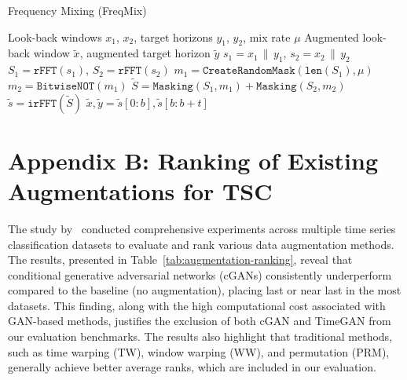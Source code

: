 \documentclass[a4paper,12pt]{report}
\begin{document}
\begin{algorithm}
   \caption{Frequency Mixing (FreqMix)~\cite{chen2023fraugfrequencydomainaugmentation}}
   \label{alg: freqmixing}
   \begin{algorithmic}[1]
       \REQUIRE
           Look-back windows $x_1$, $x_2$, target horizons $y_1$, $y_2$, mix rate $\mu$
       \ENSURE
           Augmented look-back window $\tilde{x}$, augmented target horizon $\tilde{y}$
       \STATE $s_1 = x_1 \,\|\, y_1$, \quad $s_2 = x_2 \,\|\, y_2$  \label{alg: freqmixing:concat}
       \STATE $S_1 = \texttt{rFFT}(s_1)$, \quad $S_2 = \texttt{rFFT}(s_2)$  \label{alg: freqmixing:rfft}
       \STATE $m_1 = \texttt{CreateRandomMask}(\texttt{len}(S_1), \mu)$  \label{alg: freqmixing:mask1}
       \STATE $m_2 = \texttt{BitwiseNOT}(m_1)$  \label{alg: freqmixing:mask2}
       \STATE $\tilde{S} = \texttt{Masking}(S_1, m_1) + \texttt{Masking}(S_2, m_2)$  \label{alg: freqmixing:applymask}
       \STATE $\tilde{s} = \texttt{irFFT}(\tilde{S})$  \label{alg: freqmixing:ifft}
       \STATE $\tilde{x}, \tilde{y} = \tilde{s}[0{:}b], \tilde{s}[b{:}b{+}t]$  \label{alg: freqmixing:split}
   \end{algorithmic}
\end{algorithm}





\chapter*{Appendix B: Ranking of Existing Augmentations for TSC}
\setcounter{chapter}{2} %
\setcounter{table}{0}
\setcounter{figure}{0}
\setcounter{equation}{0}
\renewcommand{\thechapter}{B}
\label{app:tscranking}

The study by~\cite{gao2024dataaugmentationtimeseriesclassification} conducted comprehensive experiments across multiple time series classification datasets to evaluate and rank various data augmentation methods. The results, presented in Table~\ref{tab:augmentation-ranking}, reveal that conditional generative adversarial networks (cGANs) consistently underperform compared to the baseline (no augmentation), placing last or near last in the most datasets. This finding, along with the high computational cost associated with GAN-based methods, justifies the exclusion of both cGAN and TimeGAN from our evaluation benchmarks. The results also highlight that traditional methods, such as time warping (TW), window warping (WW), and permutation (PRM), generally achieve better average ranks, which are included in our evaluation.
\end{document}
